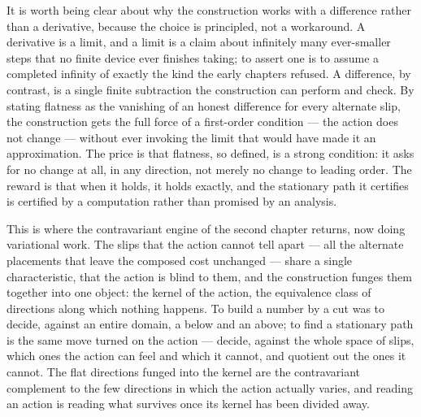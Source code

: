 It is worth being clear about why the construction works with a difference rather than a derivative,
because the choice is principled, not a workaround. A derivative is a limit, and a limit is a claim
about infinitely many ever-smaller steps that no finite device ever finishes taking; to assert one is
to assume a completed infinity of exactly the kind the early chapters refused. A difference, by
contrast, is a single finite subtraction the construction can perform and check. By stating flatness as
the vanishing of an honest difference for every alternate slip, the construction gets the full force of
a first-order condition --- the action does not change --- without ever invoking the limit that would
have made it an approximation. The price is that flatness, so defined, is a strong condition: it asks
for no change at all, in any direction, not merely no change to leading order. The reward is that when
it holds, it holds exactly, and the stationary path it certifies is certified by a computation rather
than promised by an analysis.

This is where the contravariant engine of the second chapter returns, now doing variational work. The
slips that the action cannot tell apart --- all the alternate placements that leave the composed cost
unchanged --- share a single characteristic, that the action is blind to them, and the construction
funges them together into one object: the kernel of the action, the equivalence class of directions
along which nothing happens. To build a number by a cut was to decide, against an entire domain, a
below and an above; to find a stationary path is the same move turned on the action --- decide, against
the whole space of slips, which ones the action can feel and which it cannot, and quotient out the
ones it cannot. The flat directions funged into the kernel are the contravariant complement to the few
directions in which the action actually varies, and reading an action is reading what survives once its
kernel has been divided away.

